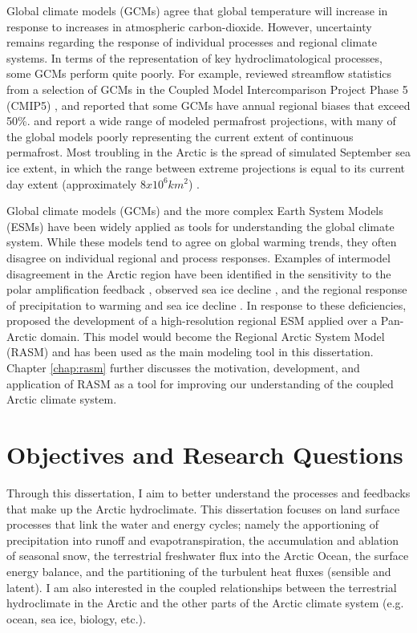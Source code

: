 Global climate models (GCMs) agree that global temperature will increase in response to increases in atmospheric carbon-dioxide.
However, uncertainty remains regarding the response of individual processes and regional climate systems.
In terms of the representation of key hydroclimatological processes, some GCMs perform quite poorly.
For example, \citet{Alkama_2013} reviewed streamflow statistics from a selection of GCMs in the Coupled Model Intercomparison Project Phase 5 (CMIP5) \citep{Taylor_2012}, and reported that some GCMs have annual regional biases that exceed 50\%.
\citet{Slater_2013} and \citet{Koven_2013} report a wide range of modeled permafrost projections, with many of the global models poorly representing the current extent of continuous permafrost.
Most troubling in the Arctic is the spread of simulated September sea ice extent, in which the range between extreme projections is equal to its current day extent (approximately $8x10^6 km^2$) \citep[e.g.][]{Maslowski_2012}.

Global climate models (GCMs) and the more complex Earth System Models (ESMs) have been widely applied as tools for understanding the global climate system.
While these models tend to agree on global warming trends, they often disagree on individual regional and process responses.
Examples of intermodel disagreement in the Arctic region have been identified in the sensitivity to the polar amplification feedback \citep{Serreze_2006b,Holland_2003}, observed sea ice decline \citep{Stroeve_2007,Zhang_2010}, and the regional response of precipitation to warming and sea ice decline \citep{Bintanja_2014}.
In response to these deficiencies, \citet{Roberts_2010} proposed the development of a high-resolution regional ESM applied over a Pan-Arctic domain.
This model would become the Regional Arctic System Model (RASM) and has been used as the main modeling tool in this dissertation.
Chapter \ref{chap:rasm} further discusses the motivation, development, and application of RASM as a tool for improving our understanding of the coupled Arctic climate system.

\section{Objectives and Research Questions}

Through this dissertation, I aim to better understand the processes and feedbacks that make up the Arctic hydroclimate.
This dissertation focuses on land surface processes that link the water and energy cycles; namely the apportioning of precipitation into runoff and evapotranspiration, the accumulation and ablation of seasonal snow, the terrestrial freshwater flux into the Arctic Ocean, the surface energy balance, and the partitioning of the turbulent heat fluxes (sensible and latent).
I am also interested in the coupled relationships between the terrestrial hydroclimate in the Arctic and the other parts of the Arctic climate system (e.g. ocean, sea ice, biology, etc.).

